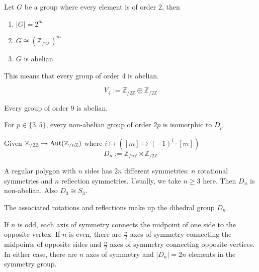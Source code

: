 \begin{proposition}
   Let \(G\) be a group where every element is of order 2, then
   \begin{enumerate}[label=\roman*, align=Center]
      \item \(|G| = 2^m\) %
      \item \(G \cong (\mathbb{Z}_{/2\mathbb{Z}})^m\)
      \item \(G\) is abelian
   \end{enumerate}
\end{proposition}

This means that every group of order 4 is abelian.

\begin{definition}
   \[V_4 := \mathbb{Z}_{/2\mathbb{Z}} \oplus \mathbb{Z}_{/2\mathbb{Z}}\]
\end{definition}

\begin{proposition}
   Every group of order 9 is abelian.
\end{proposition}

\begin{proposition}
   For \(p \in \{3, 5\}\), every non-abelian group of order \(2p\) is isomorphic to \(D_p\).
\end{proposition}

\begin{definition}
   Given \(\mathbb{Z}_{/2\mathbb{Z}} \to \operatorname{Aut}(\mathbb{Z}_{/n\mathbb{Z}})\) where \(i \mapsto ([m] \mapsto (-1)^i \cdot [m])\)
   \[D_n := \mathbb{Z}_{/n\mathbb{Z}} \rtimes \mathbb{Z}_{/2\mathbb{Z}}\]
\end{definition}
\begin{remark}[Intuition]
   A regular polygon with \(n\) sides has \(2n\) different symmetries: \(n\) rotational symmetries and \(n\) reflection symmetries.
   Usually, we take \(n \geq 3\) here.
   Then \(D_n\) is non-abelian.
   Also \(D_3 \cong S_3\).

   The associated rotations and reflections make up the dihedral group \(D_n\).

   \begin{center}
      
   \end{center}

   If \(n\) is odd, each axis of symmetry connects the midpoint of one side to the opposite vertex.
   If \(n\) is even, there are \(\frac{n}{2}\) axes of symmetry connecting the midpoints of opposite sides and \(\frac{n}{2}\) axes of symmetry connecting opposite vertices.
   In either case, there are \(n\) axes of symmetry and \(|D_n| = 2n\) elements in the symmetry group.
\end{remark}

